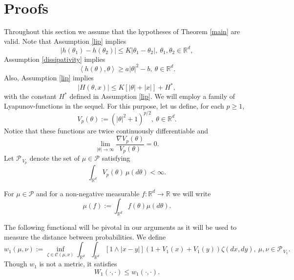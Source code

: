 \documentclass[a4paper,draft]{article}
\begin{document}
\section{Proofs}\label{po}

Throughout this section we assume that the hypotheses of Theorem \ref{main} are valid.
Note that Assumption \ref{lip} implies
\begin{equation}\label{mulyan}
|h(\theta_1)-h(\theta_2)|\leq K|\theta_1-\theta_2|,\ \theta_1,\theta_2\in\mathbb{R}^d,
\end{equation}
Assumption \ref{dissipativity} implies
\begin{equation}\label{laban}
\left\langle h(\theta),\theta\right\rangle\geq a |\theta|^2-b,\ \theta\in\mathbb{R}^d.
\end{equation}
Also, Assumption \ref{lip} implies
\begin{equation}\label{jojo}
|H(\theta,x)|\leq K[|\theta|+|x|]+H^*,
\end{equation}
with the constant $H^*$ defined in Assumption \ref{lip}.
We will employ a family of Lyapunov-functions in the sequel. For this
purpose, let us define, for each $p\geq 1$,
$$
V_p(\theta):=(|\theta|^2+1)^{p/2},\ \theta\in\mathbb{R}^d.
$$
Notice that these functions are twice continuously differentiable and
\begin{equation}\label{solymos}
\lim_{|\theta|\to\infty}\frac{\nabla V_p(\theta)}{V_p(\theta)}=0.
\end{equation}
Let $\mathcal{P}_{\, V_p}$ denote the set of $\mu\in\mathcal{P}$ satisfying
$$
\int_{\mathbb{R}^d}V_p(\theta)\,\mu(d\theta)<\infty.
$$

For $\mu\in\mathcal{P}$ and for a non-negative measurable $f:\mathbb{R}^d\to\mathbb{R}$
we will write
$$
\mu(f):=\int_{\mathbb{R}^d} f(\theta)\mu(d\theta).
$$

The following functional will be pivotal in our arguments as it will
be used to measure the distance between probabilities. We define
$$
w_1(\mu,\nu):=\inf_{\zeta\in\mathcal{C}(\mu,\nu)}\int_{\mathbb{R}^d}\int_{\mathbb{R}^d} [1\wedge |x-y|](1+V_1(x)+V_1(y))\zeta(dx,dy),\ \mu,\nu\in\mathcal{P}_{\, V_1}.
$$
Though $w_1$ is not a metric, it satisfies
\begin{equation}\label{lucia}
W_1(\cdot,\cdot)\leq w_1(\cdot,\cdot).
\end{equation}
\end{document}

